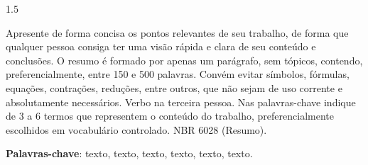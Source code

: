 
\begin{resumo}
\begin{Spacing}{1.5}
      

Apresente de forma concisa os pontos relevantes de seu trabalho, de forma que qualquer pessoa consiga ter uma visão rápida e clara de seu conteúdo e conclusões. O resumo é formado por apenas um parágrafo, sem tópicos, contendo, preferencialmente, entre 150 e 500 palavras. Convém evitar símbolos, fórmulas, equações, contrações, reduções, entre outros, que não sejam de uso corrente e absolutamente necessários. Verbo na terceira pessoa. Nas palavras-chave indique de 3 a 6 termos que representem o conteúdo do trabalho, preferencialmente escolhidos em vocabulário controlado. NBR 6028 (Resumo).
\end{Spacing}
\vspace{1cm}
\textbf{Palavras-chave}: texto, texto, texto, texto, texto, texto.

\end{resumo}



